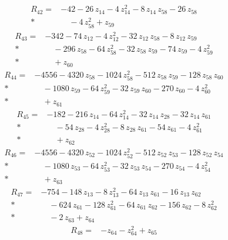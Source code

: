 \documentclass[10pt]{article}
\begin{document}
\begin{align*}
R_{42}={}& - 42 - 26\,z_{14} - 4\,z_{14}^{2} - 8\,z_{14}\,z_{58} - 26\,z_{58} \\*
&\quad - 4\,z_{58}^{2} + z_{59}
\end{align*}
\begin{align*}
R_{43}={}& - 342 - 74\,z_{12} - 4\,z_{12}^{2} - 32\,z_{12}\,z_{58} - 8\,z_{12}\,z_{59} \\*
&\quad - 296\,z_{58} - 64\,z_{58}^{2} - 32\,z_{58}\,z_{59} - 74\,z_{59} - 4\,z_{59}^{2} \\*
&\quad + z_{60}
\end{align*}
\begin{align*}
R_{44}={}& - 4556 - 4320\,z_{58} - 1024\,z_{58}^{2} - 512\,z_{58}\,z_{59} - 128\,z_{58}\,z_{60} \\*
&\quad - 1080\,z_{59} - 64\,z_{59}^{2} - 32\,z_{59}\,z_{60} - 270\,z_{60} - 4\,z_{60}^{2} \\*
&\quad + z_{61}
\end{align*}
\begin{align*}
R_{45}={}& - 182 - 216\,z_{14} - 64\,z_{14}^{2} - 32\,z_{14}\,z_{28} - 32\,z_{14}\,z_{61} \\*
&\quad - 54\,z_{28} - 4\,z_{28}^{2} - 8\,z_{28}\,z_{61} - 54\,z_{61} - 4\,z_{61}^{2} \\*
&\quad + z_{62}
\end{align*}
\begin{align*}
R_{46}={}& - 4556 - 4320\,z_{52} - 1024\,z_{52}^{2} - 512\,z_{52}\,z_{53} - 128\,z_{52}\,z_{54} \\*
&\quad - 1080\,z_{53} - 64\,z_{53}^{2} - 32\,z_{53}\,z_{54} - 270\,z_{54} - 4\,z_{54}^{2} \\*
&\quad + z_{63}
\end{align*}
\begin{align*}
R_{47}={}& - 754 - 148\,z_{13} - 8\,z_{13}^{2} - 64\,z_{13}\,z_{61} - 16\,z_{13}\,z_{62} \\*
&\quad - 624\,z_{61} - 128\,z_{61}^{2} - 64\,z_{61}\,z_{62} - 156\,z_{62} - 8\,z_{62}^{2} \\*
&\quad - 2\,z_{63} + z_{64}
\end{align*}
\begin{align*}
R_{48}={}& - z_{64} - z_{64}^{2} + z_{65}
\end{align*}
\end{document}
